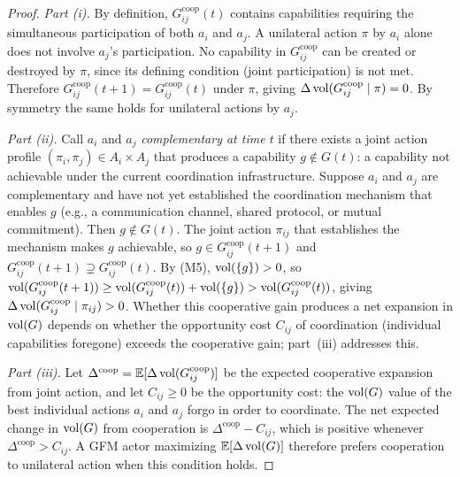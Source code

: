 \begin{proof}
\emph{Part (i).} By definition, $G^{\mathrm{coop}}_{ij}(t)$ contains
capabilities requiring the simultaneous participation of both $a_i$ and
$a_j$. A unilateral action $\pi$ by $a_i$ alone does not involve $a_j$'s
participation. No capability in $G^{\mathrm{coop}}_{ij}$ can be created or
destroyed by $\pi$, since its defining condition (joint participation) is
not met. Therefore $G^{\mathrm{coop}}_{ij}(t+1) = G^{\mathrm{coop}}_{ij}(t)$
under $\pi$, giving $\Delta \operatorname{vol}(G^{\mathrm{coop}}_{ij} \mid \pi) = 0$.
By symmetry the same holds for unilateral actions by $a_j$.

\emph{Part (ii).} Call $a_i$ and $a_j$ \emph{complementary at time $t$} if
there exists a joint action profile $(\pi_i, \pi_j) \in A_i \times A_j$ that
produces a capability $g \notin G(t)$: a capability not achievable under the
current coordination infrastructure. Suppose $a_i$ and $a_j$ are
complementary and have not yet established the coordination mechanism that
enables $g$ (e.g., a communication channel, shared protocol, or mutual
commitment). Then $g \notin G(t)$. The joint action $\pi_{ij}$ that
establishes the mechanism makes $g$ achievable, so
$g \in G^{\mathrm{coop}}_{ij}(t+1)$ and
$G^{\mathrm{coop}}_{ij}(t+1) \supsetneq G^{\mathrm{coop}}_{ij}(t)$. By (M5),
$\operatorname{vol}(\{g\}) > 0$, so
$\operatorname{vol}(G^{\mathrm{coop}}_{ij}(t+1)) \geq \operatorname{vol}(G^{\mathrm{coop}}_{ij}(t)) +
\operatorname{vol}(\{g\}) > \operatorname{vol}(G^{\mathrm{coop}}_{ij}(t))$,
giving $\Delta \operatorname{vol}(G^{\mathrm{coop}}_{ij} \mid \pi_{ij}) > 0$.
Whether this cooperative gain produces a net expansion in $\operatorname{vol}(G)$ depends on
whether the opportunity cost $C_{ij}$ of coordination (individual capabilities
foregone) exceeds the cooperative gain; part~(iii) addresses this.

\emph{Part (iii).} Let $\Delta^{\mathrm{coop}} =
\mathbb{E}[\Delta \operatorname{vol}(G^{\mathrm{coop}}_{ij})]$ be the expected cooperative
expansion from joint action, and let $C_{ij} \geq 0$ be the opportunity cost:
the $\operatorname{vol}(G)$ value of the best individual actions $a_i$ and $a_j$ forgo in
order to coordinate. The net expected change in $\operatorname{vol}(G)$ from cooperation is
$\Delta^{\mathrm{coop}} - C_{ij}$, which is positive whenever
$\Delta^{\mathrm{coop}} > C_{ij}$. A GFM actor maximizing
$\mathbb{E}[\Delta \operatorname{vol}(G)]$ therefore prefers cooperation to unilateral
action when this condition holds.
\end{proof}



